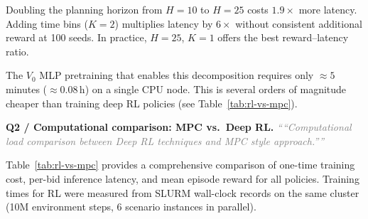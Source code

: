 \documentclass[11pt]{article}
\newcommand{\reviewer}[1]{\textit{\textcolor{gray}{``#1''}}}
\begin{document}
Doubling the planning horizon from $H{=}10$ to $H{=}25$ costs $1.9\times$ more latency.
Adding time bins ($K{=}2$) multiplies latency by $6\times$ without consistent additional
reward at 100 seeds.  In practice, $H{=}25$, $K{=}1$ offers the best
reward--latency ratio.

The $V_0$ MLP pretraining that enables this decomposition requires only $\approx 5$
minutes ($\approx 0.08$\,h) on a single CPU node.  This is several orders of magnitude
cheaper than training deep RL policies (see Table~\ref{tab:rl-vs-mpc}).

\bigskip

\noindent\textbf{Q2 / Computational comparison: MPC vs.\ Deep RL.}\quad
\reviewer{``Computational load comparison between Deep RL techniques and MPC style
approach.''}

\medskip

Table~\ref{tab:rl-vs-mpc} provides a comprehensive comparison of one-time training cost,
per-bid inference latency, and mean episode reward for all policies.  Training times for
RL were measured from SLURM wall-clock records on the same cluster (10M environment
steps, 6 scenario instances in parallel).
\end{document}
